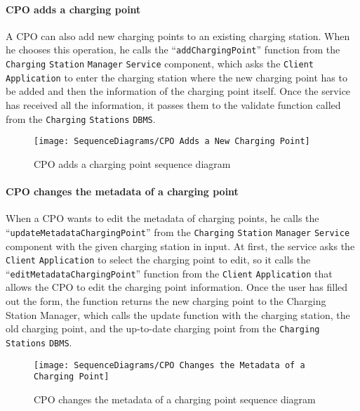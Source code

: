 \paragraph{CPO adds a charging point}
A CPO can also add new charging points to an existing charging station.
When he chooses this operation, he calls the ``\verb|addChargingPoint|'' function from the \verb|Charging| \verb|Station| \verb|Manager| \verb|Service| component, which asks the \verb|Client| \verb|Application| to enter the charging station where the new charging point has to be added and then the information of the charging point itself.
Once the service has received all the information, it passes them to the validate function called from the \verb|Charging| \verb|Stations| \verb|DBMS|\@.
\begin{figure}[H]
    \begin{center}
        \texttt{[image: SequenceDiagrams/CPO Adds a New Charging Point]}
        \caption{CPO adds a charging point sequence diagram}
        \label{cpo_adds_new_charging_point}
    \end{center}
\end{figure}

\paragraph{CPO changes the metadata of a charging point}
When a CPO wants to edit the metadata of charging points, he calls the ``\verb|updateMetadataChargingPoint|'' from the \verb|Charging| \verb|Station| \verb|Manager| \verb|Service| component with the given charging station in input.
At first, the service asks the \verb|Client| \verb|Application| to select the charging point to edit, so it calls the ``\verb|editMetadataChargingPoint|'' function from the \verb|Client| \verb|Application| that allows the CPO to edit the charging point information.
Once the user has filled out the form, the function returns the new charging point to the Charging Station Manager, which calls the update function with the charging station, the old charging point, and the up-to-date charging point from the \verb|Charging| \verb|Stations| \verb|DBMS|\@.
\begin{figure}[H]
    \begin{center}
        \texttt{[image: SequenceDiagrams/CPO Changes the Metadata of a Charging Point]}
        \caption{CPO changes the metadata of a charging point sequence diagram}
        \label{cpo_changes_metadata_of_charging_point}
    \end{center}
\end{figure}

